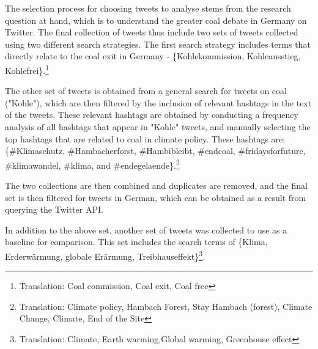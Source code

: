\documentclass[10pt,twocolumn,twoside]{layout}
\begin{document}


The selection process for choosing tweets to analyse stems from the research question at hand, which is to understand the greater coal debate in Germany on Twitter. The final collection of tweets thus include two sets of tweets collected using two different search strategies. The first search strategy includes terms that directly relate to the coal exit in Germany - \{Kohlekommission, Kohleausstieg, Kohlefrei\}.\footnote{Translation: Coal commission, Coal exit, Coal free}

The other set of tweets is obtained from a general search for tweets on coal ("Kohle"), which are then filtered by the inclusion of relevant hashtags in the text of the tweets. These relevant hashtags are obtained by conducting a frequency analysis of all hashtags that appear in "Kohle" tweets, and manually selecting the top hashtags that are related to coal in climate policy. These hashtags are:  \{\#Klimaschutz, \#Hambacherforst, \#Hambibleibt, \#endcoal, \#fridaysforfuture, \#klimawandel, \#klima, and \#endegelaende\}.\footnote{Translation: Climate policy, Hambach Forest, Stay Hambach (forest), Climate Change, Climate, End of the Site} 

The two collections are then combined and duplicates are removed, and the final set is then filtered for tweets in German, which can be obtained as a result from querying the Twitter API. 

In addition to the above set, another set of tweets was collected to use as a baseline for comparison. This set includes the search terms of \{Klima, Erderwärmung, globale Erärmung, Treibhauseffekt\}\footnote{Translation: Climate, Earth warming,Global warming, Greenhouse effect}.
\end{document}
